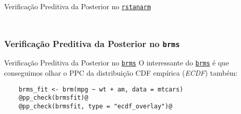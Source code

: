 \begin{frame}{Verificação Preditiva da Posterior no \href{http://mc-stan.org/rstanarm/}{\texttt{rstanarm}}}
	\begin{columns}
		\begin{column}{0.5\textwidth}
			\begin{figure}
				\centering
				\resizebox{0.8\columnwidth}{!}{}
			\end{figure}
		\end{column}
	\end{columns}
\end{frame}

\subsubsection{Verificação Preditiva da Posterior no \texttt{brms}}
\begin{frame}[fragile]{Verificação Preditiva da Posterior no \href{https://paul-buerkner.github.io/brms/}{\texttt{brms}}}
	O interessante do \href{https://paul-buerkner.github.io/brms/}{\texttt{brms}} é
	que conseguimos olhar o PPC da distribuição CDF empírica (\textit{ECDF}) também:
	\vfill
	\begin{lstlisting}
    brms_fit <- brm(mpg ~ wt + am, data = mtcars)
    @pp_check(brmsfit)@
    @pp_check(brmsfit, type = "ecdf_overlay")@
    \end{lstlisting}
\end{frame}

